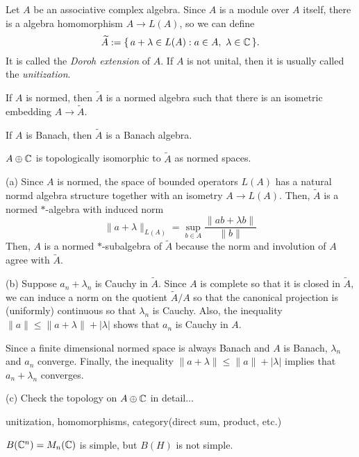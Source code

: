 \documentclass{../../large}
\begin{document}
\begin{prb}[Unitization]
Let $A$ be an associative complex algebra.
Since $A$ is a module over $A$ itself, there is a algebra homomorphism $A\to L(A)$, so we can define
\[\widetilde A:=\{\,a+\lambda\in L(A):a\in A,\ \lambda\in\mathbb{C}\,\}.\]
It is called the \emph{Doroh extension} of $A$.
If $A$ is not unital, then it is usually called the \emph{unitization}.
\begin{parts}
\item If $A$ is normed, then $\tilde A$ is a normed algebra such that there is an isometric embedding $A\to\tilde A$.
\item If $A$ is Banach, then $\tilde A$ is a Banach algebra.
\item $A\oplus\mathbb{C}$ is topologically isomorphic to $\tilde A$ as normed spaces.
\end{parts}
\end{prb}
\begin{pf}
(a)
Since $A$ is normed, the space of bounded operators $L(A)$ has a natural normd algebra structure together with an isometry $A\to L(A)$.
Then, $\tilde A$ is a normed $*$-algebra with induced norm
\[\|a+\lambda\|_{L(A)}=\sup_{b\in A}\frac{\|ab+\lambda b\|}{\|b\|}\]
Then, $A$ is a normed $*$-subalgebra of $\tilde A$ because the norm and involution of $A$ agree with $\tilde A$.

(b)
Suppose $a_n+\lambda_n$ is Cauchy in $\tilde A$.
Since $A$ is complete so that it is closed in $\tilde A$, we can induce a norm on the quotient $\tilde A/A$ so that the canonical projection is (uniformly) continuous so that $\lambda_n$ is Cauchy.
Also, the inequality $\|a\|\le\|a+\lambda\|+|\lambda|$ shows that $a_n$ is Cauchy in $A$.

Since a finite dimensional normed space is always Banach and $A$ is Banach, $\lambda_n$ and $a_n$ converge.
Finally, the inequality $\|a+\lambda\|\le\|a\|+|\lambda|$ implies that $a_n+\lambda_n$ converges.

(c)
Check the topology on $A\oplus\mathbb{C}$ in detail...
\end{pf}



unitization, homomorphisms, category(direct sum, product, etc.)

$B(\mathbb{C}^n)=M_n(\mathbb{C})$ is simple, but $B(H)$ is not simple.

\end{document}
